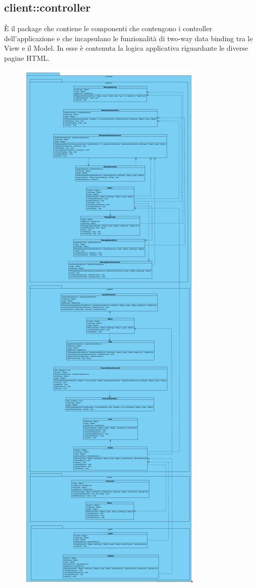 \subsection{client::controller}
È il package che contiene le componenti che contengono i
controller dell’applicazione e che incapsulano le funzionalità di two-way data binding tra le View e il Model. In esse è contenuta la logica applicativa riguardante le diverse pagine HTML.\begin{center}
	\begin{figure}[H]
		\centering \includegraphics[scale=4, max width=\textwidth, max height=\myheight]{../img/diagrammiClassi/client/controller.png}

\end{figure}
\end{center}
